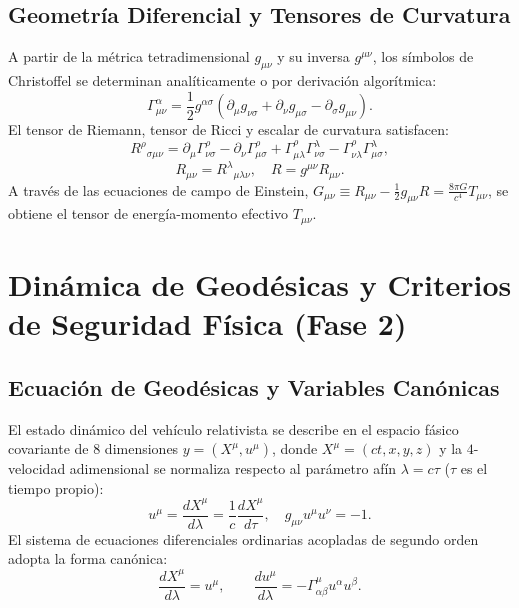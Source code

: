 \documentclass[11pt,a4paper]{article}
\begin{document}
\subsection{Geometría Diferencial y Tensores de Curvatura}
A partir de la métrica tetradimensional $g_{\mu\nu}$ y su inversa $g^{\mu\nu}$, los símbolos de Christoffel se determinan analíticamente o por derivación algorítmica:
\begin{equation}
    \Gamma^\alpha_{\mu\nu} = \frac{1}{2} g^{\alpha\sigma} \left( \partial_\mu g_{\nu\sigma} + \partial_\nu g_{\mu\sigma} - \partial_\sigma g_{\mu\nu} \right).
\end{equation}
El tensor de Riemann, tensor de Ricci y escalar de curvatura satisfacen:
\begin{equation}
    R^\rho{}_{\sigma\mu\nu} = \partial_\mu \Gamma^\rho_{\nu\sigma} - \partial_\nu \Gamma^\rho_{\mu\sigma} + \Gamma^\rho_{\mu\lambda} \Gamma^\lambda_{\nu\sigma} - \Gamma^\rho_{\nu\lambda} \Gamma^\lambda_{\mu\sigma},
\end{equation}
\begin{equation}
    R_{\mu\nu} = R^\lambda{}_{\mu\lambda\nu}, \quad R = g^{\mu\nu} R_{\mu\nu}.
\end{equation}
A través de las ecuaciones de campo de Einstein, $G_{\mu\nu} \equiv R_{\mu\nu} - \frac{1}{2} g_{\mu\nu} R = \frac{8\pi G}{c^4} T_{\mu\nu}$, se obtiene el tensor de energía-momento efectivo $T_{\mu\nu}$.

\section{Dinámica de Geodésicas y Criterios de Seguridad Física (Fase 2)}

\subsection{Ecuación de Geodésicas y Variables Canónicas}
El estado dinámico del vehículo relativista se describe en el espacio fásico covariante de 8 dimensiones $y = (X^\mu, u^\mu)$, donde $X^\mu = (c t, x, y, z)$ y la $4$-velocidad adimensional se normaliza respecto al parámetro afín $\lambda = c \tau$ ($\tau$ es el tiempo propio):
\begin{equation}
    u^\mu = \frac{dX^\mu}{d\lambda} = \frac{1}{c} \frac{dX^\mu}{d\tau}, \quad g_{\mu\nu} u^\mu u^\nu = -1.
\end{equation}
El sistema de ecuaciones diferenciales ordinarias acopladas de segundo orden adopta la forma canónica:
\begin{equation}
    \frac{d X^\mu}{d\lambda} = u^\mu, \qquad \frac{d u^\mu}{d\lambda} = -\Gamma^\mu_{\alpha\beta} u^\alpha u^\beta.
\end{equation}
\end{document}
